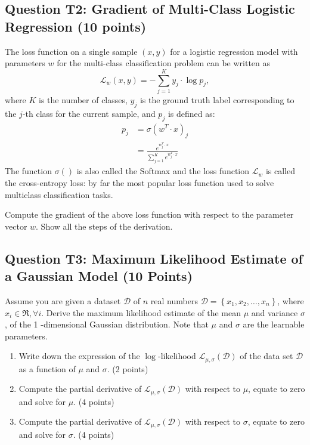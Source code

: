 \documentclass[10pt]{article}
\begin{document}
\subsection*{Question T2: Gradient of Multi-Class Logistic Regression (10 points)}
The loss function on a single sample $(x, y)$ for a logistic regression model with parameters $w$ for the multi-class classification problem can be written as
$$
\mathcal{L}_{w}(x, y)=-\sum_{j=1}^{K} y_{j} \cdot \log p_{j},
$$
where $K$ is the number of classes, $y_{j}$ is the ground truth label corresponding to the $j$-th class for the current sample, and $p_{j}$ is defined as:
$$
\begin{aligned}
p_{j} &=\sigma\left(w^{T} \cdot x\right)_{j} \\
&=\frac{e^{w_{j}^{T} \cdot x}}{\sum_{j=1}^{K} e^{w_{j}^{T} \cdot x}}
\end{aligned}
$$
The function $\sigma()$ is also called the Softmax and the loss function $\mathcal{L}_{w}$ is called the cross-entropy loss: by far the most popular loss function used to solve multiclass classification tasks.

Compute the gradient of the above loss function with respect to the parameter vector $w$. Show all the steps of the derivation.

\subsection*{Question T3: Maximum Likelihood Estimate of a Gaussian Model (10 Points)}
Assume you are given a dataset $\mathcal{D}$ of $n$ real numbers $\mathcal{D}=\left\{x_{1}, x_{2}, \ldots, x_{n}\right\}$, where $x_{i} \in \Re, \forall i$. Derive the maximum likelihood estimate of the mean $\mu$ and variance $\sigma$, of the 1 -dimensional Gaussian distribution. Note that $\mu$ and $\sigma$ are the learnable parameters.

\begin{enumerate}
  \item Write down the expression of the $\log$-likelihood $\mathcal{L}_{\mu, \sigma}(\mathcal{D})$ of the data set $\mathcal{D}$ as a function of $\mu$ and $\sigma$. (2 points)

  \item Compute the partial derivative of $\mathcal{L}_{\mu, \sigma}(\mathcal{D})$ with respect to $\mu$, equate to zero and solve for $\mu$. (4 points)

  \item Compute the partial derivative of $\mathcal{L}_{\mu, \sigma}(\mathcal{D})$ with respect to $\sigma$, equate to zero and solve for $\sigma$. (4 points)

\end{enumerate}
\end{document}
